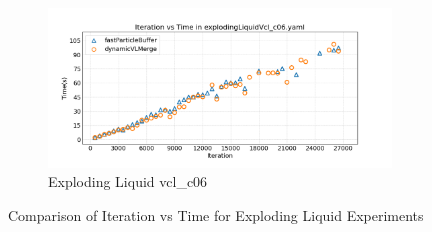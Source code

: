 \begin{figure}[htbp]
    \begin{subfigure}[b]{\textwidth}
        \centering
        \includegraphics[width=0.9\linewidth]{graphs/explodingLiquid/normalExperiments/iter/vclc06.png}
        \vspace{-0.5em}
        \caption{\scriptsize Exploding Liquid vcl\_c06}
        \label{fig:vclc06explodingLiquidIter}
    \end{subfigure}

    \vspace{1em}
    \caption{Comparison of Iteration vs Time for Exploding Liquid Experiments}
    \label{fig:mainexplodingLiquidIter}
\end{figure}



